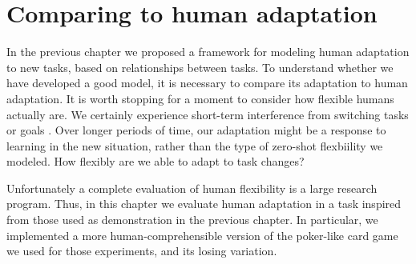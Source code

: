 \chapter{Comparing to human adaptation} \label{chapter:human}

In the previous chapter we proposed a framework for modeling human adaptation to new tasks, based on relationships between tasks. To understand whether we have developed a good model, it is necessary to compare its adaptation to human adaptation. It is worth stopping for a moment to consider how flexible humans actually are. We certainly experience short-term interference from switching tasks or goals \citep{Rogers1995}. Over longer periods of time, our adaptation might be a response to learning in the new situation, rather than the type of zero-shot flexbiility we modeled. How flexibly are we able to adapt to task changes? \par
Unfortunately a complete evaluation of human flexibility is a large research program. Thus, in this chapter we evaluate human adaptation in a task inspired from those used as demonstration in the previous chapter. In particular, we implemented a more human-comprehensible version of the poker-like card game we used for those experiments, and its losing variation. \par

